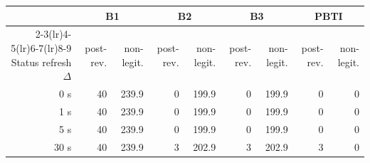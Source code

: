 \begin{tabular}{rrrrrrrrr}
\toprule
& \multicolumn{2}{c}{B1} & \multicolumn{2}{c}{B2} & \multicolumn{2}{c}{B3} & \multicolumn{2}{c}{PBTI}\\
\cmidrule(lr){2-3}\cmidrule(lr){4-5}\cmidrule(lr){6-7}\cmidrule(lr){8-9}
Status refresh $\Delta$ & post-rev. & non-legit. & post-rev. & non-legit. & post-rev. & non-legit. & post-rev. & non-legit.\\
\midrule
0 s & 40 & 239.9 & 0 & 199.9 & 0 & 199.9 & 0 & 0\\
1 s & 40 & 239.9 & 0 & 199.9 & 0 & 199.9 & 0 & 0\\
5 s & 40 & 239.9 & 0 & 199.9 & 0 & 199.9 & 0 & 0\\
30 s & 40 & 239.9 & 3 & 202.9 & 3 & 202.9 & 3 & 0\\
\bottomrule
\end{tabular}